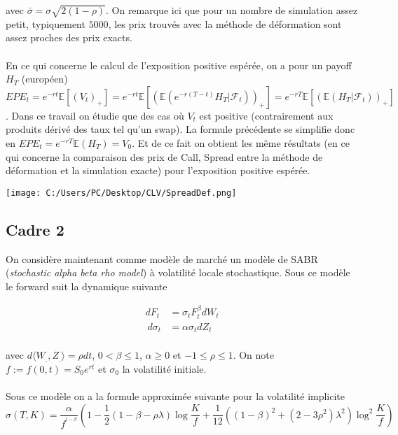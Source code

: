 \documentclass[a4paper,12pt]{report}
\numberwithin{equation}{section}
\theoremstyle{definition}
\numberwithin{equation}{section}
\begin{document}
avec $\bar \sigma = \sigma \sqrt{2 (1 - \rho)}$. On remarque ici 
que pour un nombre de simulation assez petit, typiquement $5000$, les prix trouvés avec la méthode de déformation sont assez proches des prix exacts. \\\\
En ce qui concerne le calcul de l'exposition positive espérée, on a pour un payoff $H_T$ (européen) $EPE_t = e^{-rt}\mathbb{E}\left[ (V_t)_+ \right] = e^{-rt}\mathbb{E}\left[ \left(\mathbb{E}\left( e^{-r(T-t)} H_T | \mathcal{F}_t\right)\right)_+ \right] = e^{-rT} \mathbb{E}\left[ \left(\mathbb{E} \left( H_T | \mathcal{F}_t\right)\right)_+ \right]$. Dans ce travail on étudie que des cas où $V_t$ est positive (contrairement aux produits dérivé des taux tel qu'un swap). La formule précédente se simplifie donc en  $EPE_t = e^{-rT} \mathbb{E}(H_T)=V_0$. Et de ce fait on obtient les même résultats (en ce qui concerne la comparaison des prix de Call, Spread entre la méthode de déformation et la simulation exacte) pour l'exposition positive espérée.  
\begin{center}
\texttt{[image: C:/Users/PC/Desktop/CLV/SpreadDef.png]}
\end{center}
\subsection{Cadre 2}
\label{modelmarket}
On considère maintenant comme modèle de marché un modèle de SABR \cite{SABR} (\textit{stochastic alpha beta rho model}) à volatilité locale stochastique. Sous ce modèle le forward suit la dynamique suivante

\begin{equation}
\begin{split}
dF_{t} & =\sigma_{t}F_{t}^{\beta}dW_{t}\\\
d\sigma_{t} & =\alpha\sigma_{t}dZ_{t}\\
\end{split}
\end{equation}

avec $d\langle W_{.},Z_{.}\rangle=\rho dt$, $0 <\beta\leq1$, $\alpha\geq0$ et $-1\leq\rho\leq1$. On note $f :=f(0,t)=S_{0}e^{rt}$ et $\sigma_{0}$ la volatilité initiale. \\\\Sous ce modèle on a la formule approximée suivante pour la volatilité implicite $$\sigma(T,K)=\frac{\alpha}{f^{^{1-\beta}}}\left(1-\frac{1}{2}\left(1-\beta-\rho\lambda\right)\log\frac{K}{f}+\frac{1}{12}\left(\left(1-\beta\right)^{2}+\left(2-3\rho^{2}\right)\lambda^{2}\right)\log^{2}\frac{K}{f}\right)$$
\end{document}
